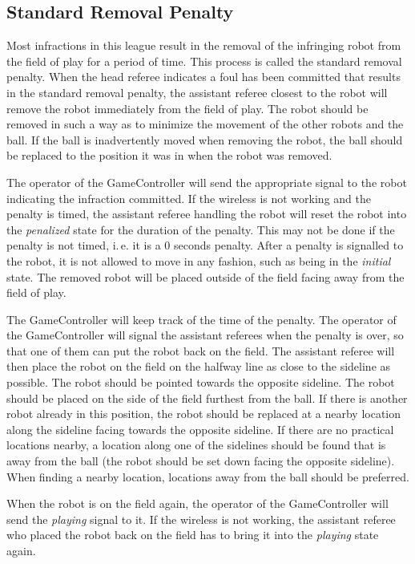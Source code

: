 \documentclass[12pt]{article}
\newcommand{\ie}{\mbox{i.\,e.}\xspace}
\begin{document}
\subsection{Standard Removal Penalty}
\label{sec:removal_penalty}

Most infractions in this league result in the removal of the
infringing robot from the field of play for a period of time.  This
process is called the standard removal penalty.  When the head
referee indicates a foul has been committed that results in the
standard removal penalty, the assistant referee closest to the robot
will remove the robot immediately from the field of play.  The robot
should be removed in such a way as to minimize the movement of the
other robots and the ball.  If the ball is inadvertently moved when
removing the robot, the ball should be replaced to the position it
was in when the robot was removed.

The operator of the GameController will send the appropriate signal
to the robot indicating the infraction committed. 
If the wireless is
not working and the penalty is timed, the assistant referee handling
the robot will reset the robot into the \emph{penalized} state for
the duration of the penalty. 
This may not be done if the penalty is not
timed, \ie it is a 0 seconds penalty. After a penalty is signalled
to the robot, it is not allowed to move in any fashion, such as being
in the \emph{initial} state. The removed robot will be placed
outside of the field facing away from the field of play. 

The GameController will keep track of the time of the penalty. The
operator of the GameController will signal the assistant referees
when the penalty is over, so that one of them can put the robot back
on the field. The assistant referee will then place the robot on the
field on the halfway line as close to the sideline as possible.  The
robot should be pointed towards the opposite sideline.  The robot
should be placed on the side of the field furthest from the ball.
If there is another robot already in this position, the robot should
be replaced at a nearby location along the sideline facing towards
the opposite sideline.  If there are no practical locations nearby,
a location along one of the sidelines should be found that is away
from the ball (the robot should be set down facing the opposite
sideline).  When finding a nearby location, locations away from the
ball should be preferred.

When the robot is on the field again, the operator of the
GameController will send the \emph{playing} signal to it. 
If the
wireless is not working, the assistant referee who placed the robot
back on the field has to bring it into the \emph{playing} state
again.
\end{document}

